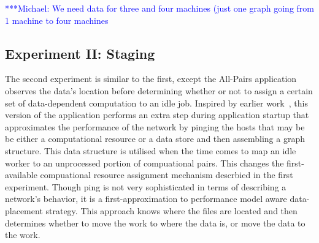 \documentclass{rspublic}
\newcommand{\micnote}[1]{ {\textcolor{blue} { ***Michael: #1 }}}
\newcommand{\betynote}[1]{ {\textcolor{orange} { ***Bety: #1 }}}
\newcommand{\jhanote}[1]{} \newcommand{\micnote}[1]{}\newcommand{\betynote}[1]{} \newcommand{\fixme}[1]{}
\begin{document}
\jhanote{We need data for compute (comparision) and I/O (only) for
different data-set sizes} \micnote{We need data for three and four
machines (just one graph going from 1 machine to four machines}

\subsection{Experiment II: Staging}
The second experiment is similar to the
first, except the All-Pairs application observes the data's location
before determining whether or not to assign a certain set of
data-dependent computation to an idle job.  Inspired by earlier
work~\citep{netperf}, this version of the application performs an extra
step during application startup that approximates the performance of the
network by pinging the hosts that may be be either a computational
resource or a data store and then  assembling a graph structure.  This
data structure is utilised when the time comes to map an idle worker to
an unprocessed portion of compuational pairs.  This changes the
first-available compuational resource assignment mechanism descrbied in
the first experiment.  Though ping is not very sophisticated in terms of
describing a network's behavior, it is a first-approximation to
performance model aware data-placement strategy.  This approach knows
where the files are located and then determines whether to move the work
to where the data is, or move the data to the work.  \jhanote{Data-aware
placement is also required, i.e., managing location of files.}  
\end{document}
